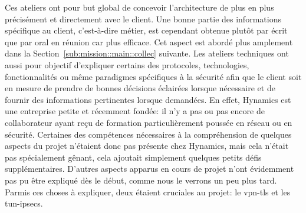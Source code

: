 \documentclass[12pt, oneside, a4paper, titlepage]{report}
\begin{document}
Ces ateliers ont pour but global de concevoir l'architecture de plus en plus
précisément et directement avec le client. Une bonne partie des informations
spécifique au client, c'est-à-dire métier, est cependant obtenue plutôt par
écrit que par oral en réunion car plus efficace.  Cet aspect est abordé plus
amplement dans la Section~\ref{sub:mission::main::collec} suivante. Les ateliers
techniques ont aussi pour objectif d'expliquer certains des protocoles,
technologies, fonctionnalités ou même paradigmes spécifiques à la sécurité afin
que le client soit en mesure de prendre de bonnes décisions éclairées lorsque
nécessaire et de fournir des informations pertinentes lorsque demandées. En
effet, Hynamics est une entreprise petite et récemment fondée: il n'y a pas ou
pas encore de collaborateur ayant reçu de formation particulièrement poussée en
réseau ou en sécurité. Certaines des compétences nécessaires à la compréhension
de quelques aspects du projet n'étaient donc pas présente chez Hynamics, mais
cela n'était pas spécialement gênant, cela ajoutait simplement quelques petits
défis supplémentaires. D'autres aspects apparus en cours de projet n'ont
évidemment pas pu être expliqué dès le début, comme nous le verrons un peu plus
tard. Parmis ces choses à expliquer, deux étaient cruciales au projet: le
\gls{vpn-tls} et les \glspl{tun-ipsec}.
\end{document}
